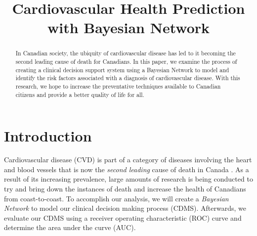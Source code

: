 \documentclass[conference]{IEEEtran}
\begin{document}
\title{Cardiovascular Health Prediction with Bayesian Network}


\author{
}

\maketitle

\begin{abstract}
In Canadian society, the ubiquity of cardiovascular disease has led to it becoming the second leading cause of death for Canadians. In this paper, we examine the process of creating a clinical decision support system using a Bayesian Network to model and identify the risk factors associated with a diagnosis of cardiovascular disease. With this research, we hope to increase the preventative techniques available to Canadian citizens and provide a better quality of life for all.
\end{abstract}

\IEEEpeerreviewmaketitle

\section{Introduction}
Cardiovascular disease (CVD) is part of a category of diseases involving the heart and blood vessels that is now the \textit{second leading} cause of death in Canada \cite{StatsCan}. As a result of its increasing prevalence, large amounts of research is being conducted to try and bring down the instances of death and increase the health of Canadians from coast-to-coast. To accomplish our analysis, we will create a \textit{Bayesian Network} to model our clinical decision making process (CDMS). Afterwards, we evaluate our CDMS using a receiver operating characteristic (ROC) curve and determine the area under the curve (AUC).  
\end{document}
